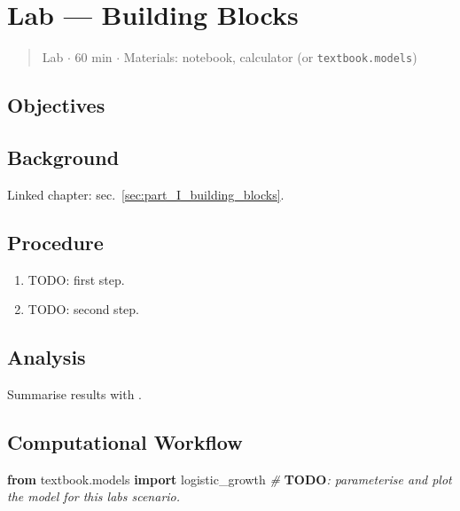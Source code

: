 \documentclass[
]{article}
\newenvironment{Shaded}{}{}
\newcommand{\AlertTok}[1]{\textcolor[rgb]{1.00,0.00,0.00}{\textbf{#1}}}
\newcommand{\CommentTok}[1]{\textcolor[rgb]{0.38,0.63,0.69}{\textit{#1}}}
\newcommand{\ImportTok}[1]{\textcolor[rgb]{0.00,0.50,0.00}{\textbf{#1}}}
\newcommand{\NormalTok}[1]{#1}
\theoremstyle{plain}
\theoremstyle{definition}
\begin{document}
\section{Lab --- Building Blocks}\label{sec:lab_part_I_building_blocks}

\begin{quote}
Lab \texorpdfstring{\ensuremath{\cdot}}{.} 60 min \texorpdfstring{\ensuremath{\cdot}}{.} Materials: notebook, calculator (or
\texttt{textbook.models})
\end{quote}

\subsection{Objectives}\label{objectives-4}

\subsection{Background}\label{background-4}

Linked chapter: sec.~\ref{sec:part_I_building_blocks}.

\subsection{Procedure}\label{procedure-4}

\begin{enumerate}
\def\labelenumi{\arabic{enumi}.}
\item
  TODO: first step.
\item
  TODO: second step.
\end{enumerate}

\subsection{Analysis}\label{analysis-4}

Summarise results with .

\subsection{Computational Workflow}\label{computational-workflow-4}

\begin{Shaded}
\begin{Highlighting}[]
\ImportTok{from}\NormalTok{ textbook.models }\ImportTok{import}\NormalTok{ logistic\_growth}
\CommentTok{\# }\AlertTok{TODO}\CommentTok{: parameterise and plot the model for this lab\textquotesingle{}s scenario.}
\end{Highlighting}
\end{Shaded}
\end{document}
